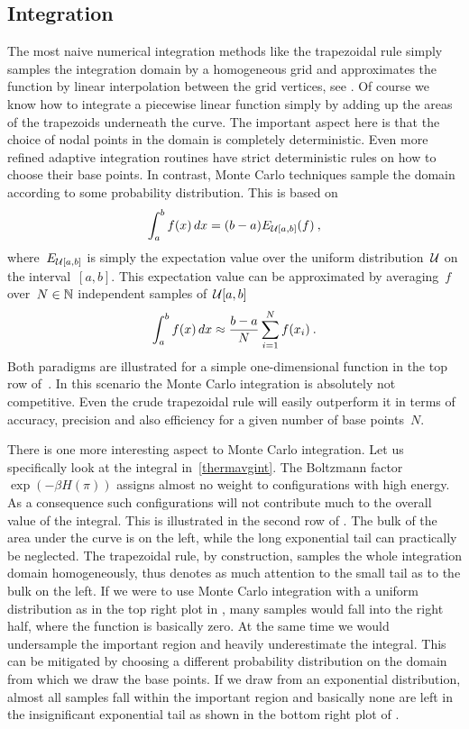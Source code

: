 \subsection{Integration}

The most naive numerical integration methods like the trapezoidal rule simply
samples the integration domain by a homogeneous grid and approximates the
function by linear interpolation between the grid vertices, see
. Of course we know how to integrate a piecewise linear function
simply by adding up the areas of the trapezoids underneath the curve.  The
important aspect here is that the choice of nodal points in the domain is
completely deterministic. Even more refined adaptive integration routines have
strict deterministic rules on how to choose their base points. In contrast,
Monte Carlo techniques sample the domain according to some probability
distribution. This is based on
%
\begin{equation}
  \int_a^b f(x) \,dx = (b-a) E_{\mathcal{U}[a,b]}(f)\:,
\end{equation}
%
where~$E_{\mathcal{U}[a,b]}$ is simply the expectation value over the uniform
distribution~$\mathcal{U}$ on the interval~$[a,b]$. This expectation value can be
approximated by averaging~$f$ over~$N \in \mathbb{N}$ independent samples of~$\mathcal{U}[a,b]$
%
\begin{equation}
  \int_a^b f(x) \,dx \approx \frac{b-a}{N} \sum_{i=1}^N f(x_i)\:.
\end{equation}
%
Both paradigms are illustrated for a simple one-dimensional function in the top
row of~. In this scenario the Monte Carlo integration is
absolutely not competitive. Even the crude trapezoidal rule will easily
outperform it in terms of accuracy, precision and also efficiency for a given
number of base points~$N$.

There is one more interesting aspect to Monte Carlo integration. Let us
specifically look at the integral in~\eqref{thermavgint}. The Boltzmann
factor~$\exp(-\beta H(\pi))$ assigns almost no weight to configurations with
high energy. As a consequence such configurations will not contribute much to
the overall value of the integral. This is illustrated in the second row of
. The bulk of the area under the curve is on the left, while the
long exponential tail can practically be neglected. The trapezoidal rule, by
construction, samples the whole integration domain homogeneously, thus denotes
as much attention to the small tail as to the bulk on the left. If we were to
use Monte Carlo integration with a uniform distribution as in the top right plot
in , many samples would fall into the right half, where the
function is basically zero. At the same time we would undersample the important
region and heavily underestimate the integral. This can be mitigated by choosing
a different probability distribution on the domain from which we draw the base
points. If we draw from an exponential distribution, almost all samples fall
within the important region and basically none are left in the insignificant
exponential tail as shown in the bottom right plot of .

